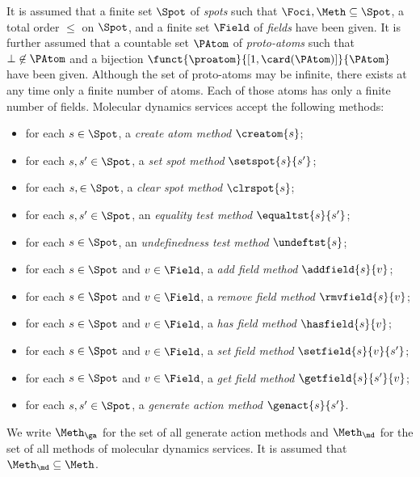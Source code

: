 \documentclass[fleqn]{llncs}
\begin{document}
It is assumed that a finite set $\Spot$ of \emph{spots} such that
$\Foci,\Meth \subseteq \Spot$, a total order $\leq$ on $\Spot$, and a
finite set $\Field$ of \emph{fields} have been given.
It is further assumed that a countable set $\PAtom$ of
\emph{proto-atoms} such that $\bot \not\in \PAtom$ and a bijection
$\funct{\proatom}{[1,\card(\PAtom)]}{\PAtom}$ have been given.
Although the set of proto-atoms may be infinite, there exists at any
time only a finite number of atoms.
Each of those atoms has only a finite number of fields.
Molecular dynamics services accept the following methods:
\begin{itemize}
\item
for each $s \in \Spot$, a \emph{create atom method} $\creatom{s}$;
\item
for each $s,s' \in \Spot$, a \emph{set spot method} $\setspot{s}{s'}$;
\item
for each $s, \in \Spot$, a \emph{clear spot method} $\clrspot{s}$;
\item
for each $s,s' \in \Spot$,
an \emph{equality test method} $\equaltst{s}{s'}$;
\item
for each $s \in \Spot$,
an \emph{undefinedness test method} $\undeftst{s}$;
\item
for each $s \in \Spot$ and $v \in \Field$,
a \emph{add field method} $\addfield{s}{v}$;
\item
for each $s \in \Spot$ and $v \in \Field$,
a \emph{remove field method} $\rmvfield{s}{v}$;
\item
for each $s \in \Spot$ and $v \in \Field$,
a \emph{has field method} $\hasfield{s}{v}$;
\item
for each $s \in \Spot$ and $v \in \Field$,
a \emph{set field method} $\setfield{s}{v}{s'}$;
\item
for each $s \in \Spot$ and $v \in \Field$,
a \emph{get field method} $\getfield{s}{s'}{v}$;
\item
for each $s,s' \in \Spot$,
a \emph{generate action method} $\genact{s}{s'}$.
\end{itemize}
We write $\Meth_\ga$ for the set of all generate action methods and
$\Meth_\md$ for the set of all methods of molecular dynamics services.
It is assumed that $\Meth_\md \subseteq \Meth$.
\end{document}
